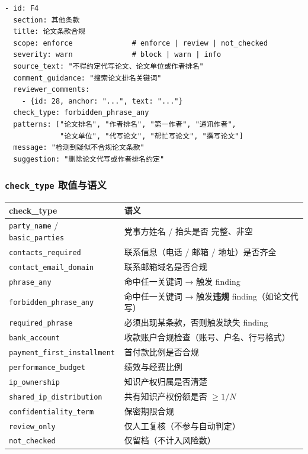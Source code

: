 \documentclass[11pt,a4paper]{article}
\begin{document}
\begin{lstlisting}[style=yaml]
- id: F4
  section: 其他条款
  title: 论文条款合规
  scope: enforce              # enforce | review | not_checked
  severity: warn              # block | warn | info
  source_text: "不得约定代写论文、论文单位或作者排名"
  comment_guidance: "搜索论文排名关键词"
  reviewer_comments:
    - {id: 28, anchor: "...", text: "..."}
  check_type: forbidden_phrase_any
  patterns: ["论文排名", "作者排名", "第一作者", "通讯作者",
             "论文单位", "代写论文", "帮忙写论文", "撰写论文"]
  message: "检测到疑似不合规论文条款"
  suggestion: "删除论文代写或作者排名约定"
\end{lstlisting}

\subsubsection{\texttt{check\_type} 取值与语义}

\begin{longtable}{p{4.6cm} p{10.8cm}}
\toprule
\textbf{check\_type} & \textbf{语义} \\ \midrule
\endhead
\texttt{party\_name} / \texttt{basic\_parties} & 党事方姓名 / 抬头是否
完整、非空 \\
\texttt{contacts\_required} & 联系信息（电话 / 邮箱 / 地址）是否齐全 \\
\texttt{contact\_email\_domain} & 联系邮箱域名是否合规 \\
\texttt{phrase\_any} & 命中任一关键词 → 触发 finding \\
\texttt{forbidden\_phrase\_any} & 命中任一关键词 → 触发\textbf{违规}
finding（如论文代写） \\
\texttt{required\_phrase} & 必须出现某条款，否则触发缺失 finding \\
\texttt{bank\_account} & 收款账户合规检查（账号、户名、行号格式） \\
\texttt{payment\_first\_installment} & 首付款比例是否合规 \\
\texttt{performance\_budget} & 绩效与经费比例 \\
\texttt{ip\_ownership} & 知识产权归属是否清楚 \\
\texttt{shared\_ip\_distribution} & 共有知识产权份额是否 $\ge 1/N$ \\
\texttt{confidentiality\_term} & 保密期限合规 \\
\texttt{review\_only} & 仅人工复核（不参与自动判定） \\
\texttt{not\_checked} & 仅留档（不计入风险数） \\
\bottomrule
\end{longtable}
\end{document}
